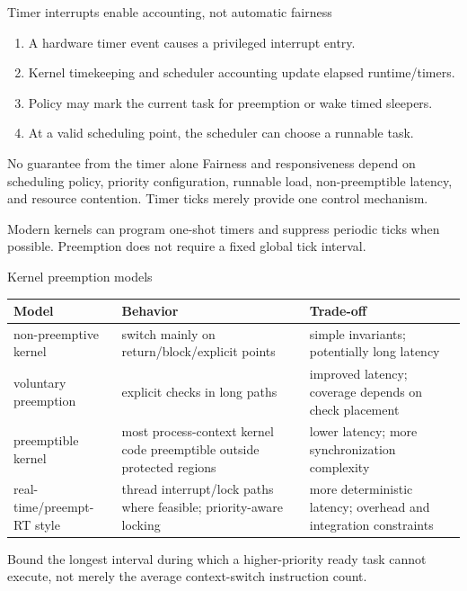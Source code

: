 \documentclass[aspectratio=169,11pt]{beamer}
\begin{document}
\begin{frame}{Timer interrupts enable accounting, not automatic fairness}
  \begin{enumerate}
    \item A hardware timer event causes a privileged interrupt entry.
    \item Kernel timekeeping and scheduler accounting update elapsed runtime/timers.
    \item Policy may mark the current task for preemption or wake timed sleepers.
    \item At a valid scheduling point, the scheduler can choose a runnable task.
  \end{enumerate}
  \begin{alertblock}{No guarantee from the timer alone}
    Fairness and responsiveness depend on scheduling policy, priority configuration, runnable load, non-preemptible latency, and resource contention. Timer ticks merely provide one control mechanism.
  \end{alertblock}
  \begin{tcolorbox}[title=Tickless kernels]
    Modern kernels can program one-shot timers and suppress periodic ticks when possible. Preemption does not require a fixed global tick interval.
  \end{tcolorbox}
\end{frame}

\begin{frame}{Kernel preemption models}
  \small
  \begin{tabularx}{\textwidth}{@{}lXX@{}}
    \toprule
    \textbf{Model} & \textbf{Behavior} & \textbf{Trade-off} \\
    \midrule
    non-preemptive kernel & switch mainly on return/block/explicit points & simple invariants; potentially long latency \\
    voluntary preemption & explicit checks in long paths & improved latency; coverage depends on check placement \\
    preemptible kernel & most process-context kernel code preemptible outside protected regions & lower latency; more synchronization complexity \\
    real-time/preempt-RT style & thread interrupt/lock paths where feasible; priority-aware locking & more deterministic latency; overhead and integration constraints \\
    \bottomrule
  \end{tabularx}
  \begin{tcolorbox}[title=Design goal]
    Bound the longest interval during which a higher-priority ready task cannot execute, not merely the average context-switch instruction count.
  \end{tcolorbox}
\end{frame}
\end{document}
